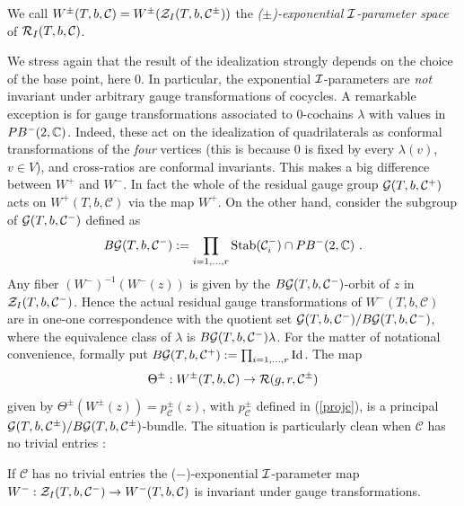     \begin{defi}\label{phasespace} {\rm We call
        $W^\pm(T,b,\mathcal{C}) = W^\pm({\mathcal Z}_I(T,b,\mathcal{C}^\pm))$
        the {\it ($\pm$)-exponential ${\mathcal I}$-parameter space} of
        ${\mathcal R}_I(T,b,\mathcal{C})$. }
\end{defi}
We stress again that the result of the idealization strongly
depends on the choice of the base point, here $0$. In particular,
the exponential ${\mathcal I}$-parameters are {\it not} invariant under
arbitrary gauge transformations of cocycles.  A remarkable
exception is for gauge transformations associated to $0$-cochains
$\lambda$ with values in $PB^-(2,{\mathbb C})$. Indeed, these act on the
idealization of quadrilaterals as conformal transformations of the
{\it four} vertices (this is because $0$ is fixed by every
$\lambda(v)$, $v \in V$), and cross-ratios are conformal
invariants. This makes a big difference between $W^+$ and $W^-$.
In fact the whole of the residual gauge group
${\mathcal G}(T,b,\mathcal{C}^+)$ acts on $W^+(T,b,\mathcal{C})$ via the
map $W^+$. On the other hand, consider the subgroup of
${\mathcal G}(T,b,\mathcal{C}^-)$ defined as $$B{\mathcal G}(T,b,\mathcal{C}^-):=
\prod_{i=1,\dots, r}{\rm Stab}(\mathcal{C}^-_i)\cap PB^-(2,{\mathbb C}) \
.$$ Any fiber $(W^-)^{-1}(W^-(z))$ is given by the
$B{\mathcal G}(T,b,\mathcal{C}^-)$-orbit of $z$ in
${\mathcal Z}_I(T,b,\mathcal{C}^-)$. Hence the actual residual gauge
transformations of $W^-(T,b,\mathcal{C})$ are in one-one
correspondence with the quotient set ${\mathcal G}(T,b,\mathcal{C}^-)/
B{\mathcal G}(T,b,\mathcal{C}^-)$, where the equivalence class of $\lambda$
is $B{\mathcal G}(T,b,\mathcal{C}^-)\lambda$. For the matter of notational
convenience, formally put $\textstyle B{\mathcal G}(T,b,\mathcal{C}^+):=
\prod_{i=1,\dots, r} {\rm Id}$. The map $$\Theta^\pm:
W^\pm(T,b,\mathcal{C}) \to {\mathcal R}(g,r,\mathcal{C}^\pm)$$ given by $
\Theta^\pm(W^\pm(z))= p^\pm_{\mathcal{C}}(z)$, with
$p^\pm_{\mathcal{C}}$ defined in (\ref{projc}), is a principal
${\mathcal G} (T,b,\mathcal{C}^\pm)/ B{\mathcal G}(T,b,\mathcal{C}^\pm)$-bundle. The
situation is particularly clean when $\mathcal{C}$ has no trivial
entries :
\begin{prop}\label{no-gauge} If $\mathcal{C}$ has no trivial entries
the ($-$)-exponential ${\mathcal I}$-parameter map $W^-:
  {\mathcal Z}_I(T,b,\mathcal{C}^-) \rightarrow W^-(T,b,\mathcal{C})$ is
  invariant under gauge transformations.
\end{prop}


